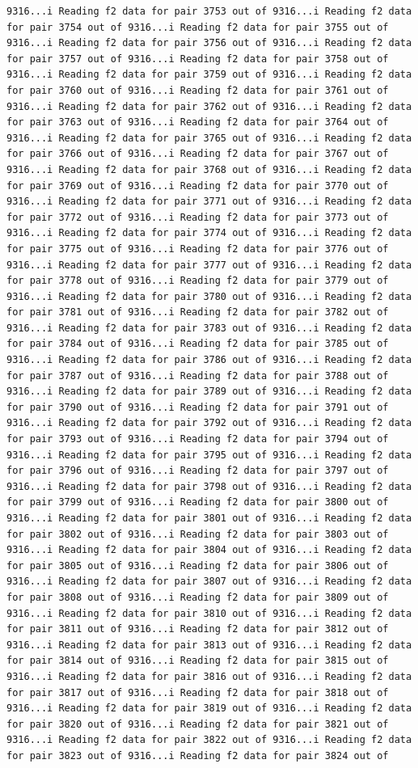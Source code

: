 \documentclass[
]{article}
\begin{document}
\begin{verbatim}
9316...i Reading f2 data for pair 3753 out of 9316...i Reading f2 data for pair 3754 out of 9316...i Reading f2 data for pair 3755 out of 9316...i Reading f2 data for pair 3756 out of 9316...i Reading f2 data for pair 3757 out of 9316...i Reading f2 data for pair 3758 out of 9316...i Reading f2 data for pair 3759 out of 9316...i Reading f2 data for pair 3760 out of 9316...i Reading f2 data for pair 3761 out of 9316...i Reading f2 data for pair 3762 out of 9316...i Reading f2 data for pair 3763 out of 9316...i Reading f2 data for pair 3764 out of 9316...i Reading f2 data for pair 3765 out of 9316...i Reading f2 data for pair 3766 out of 9316...i Reading f2 data for pair 3767 out of 9316...i Reading f2 data for pair 3768 out of 9316...i Reading f2 data for pair 3769 out of 9316...i Reading f2 data for pair 3770 out of 9316...i Reading f2 data for pair 3771 out of 9316...i Reading f2 data for pair 3772 out of 9316...i Reading f2 data for pair 3773 out of 9316...i Reading f2 data for pair 3774 out of 9316...i Reading f2 data for pair 3775 out of 9316...i Reading f2 data for pair 3776 out of 9316...i Reading f2 data for pair 3777 out of 9316...i Reading f2 data for pair 3778 out of 9316...i Reading f2 data for pair 3779 out of 9316...i Reading f2 data for pair 3780 out of 9316...i Reading f2 data for pair 3781 out of 9316...i Reading f2 data for pair 3782 out of 9316...i Reading f2 data for pair 3783 out of 9316...i Reading f2 data for pair 3784 out of 9316...i Reading f2 data for pair 3785 out of 9316...i Reading f2 data for pair 3786 out of 9316...i Reading f2 data for pair 3787 out of 9316...i Reading f2 data for pair 3788 out of 9316...i Reading f2 data for pair 3789 out of 9316...i Reading f2 data for pair 3790 out of 9316...i Reading f2 data for pair 3791 out of 9316...i Reading f2 data for pair 3792 out of 9316...i Reading f2 data for pair 3793 out of 9316...i Reading f2 data for pair 3794 out of 9316...i Reading f2 data for pair 3795 out of 9316...i Reading f2 data for pair 3796 out of 9316...i Reading f2 data for pair 3797 out of 9316...i Reading f2 data for pair 3798 out of 9316...i Reading f2 data for pair 3799 out of 9316...i Reading f2 data for pair 3800 out of 9316...i Reading f2 data for pair 3801 out of 9316...i Reading f2 data for pair 3802 out of 9316...i Reading f2 data for pair 3803 out of 9316...i Reading f2 data for pair 3804 out of 9316...i Reading f2 data for pair 3805 out of 9316...i Reading f2 data for pair 3806 out of 9316...i Reading f2 data for pair 3807 out of 9316...i Reading f2 data for pair 3808 out of 9316...i Reading f2 data for pair 3809 out of 9316...i Reading f2 data for pair 3810 out of 9316...i Reading f2 data for pair 3811 out of 9316...i Reading f2 data for pair 3812 out of 9316...i Reading f2 data for pair 3813 out of 9316...i Reading f2 data for pair 3814 out of 9316...i Reading f2 data for pair 3815 out of 9316...i Reading f2 data for pair 3816 out of 9316...i Reading f2 data for pair 3817 out of 9316...i Reading f2 data for pair 3818 out of 9316...i Reading f2 data for pair 3819 out of 9316...i Reading f2 data for pair 3820 out of 9316...i Reading f2 data for pair 3821 out of 9316...i Reading f2 data for pair 3822 out of 9316...i Reading f2 data for pair 3823 out of 9316...i Reading f2 data for pair 3824 out of 
\end{verbatim}
\end{document}

